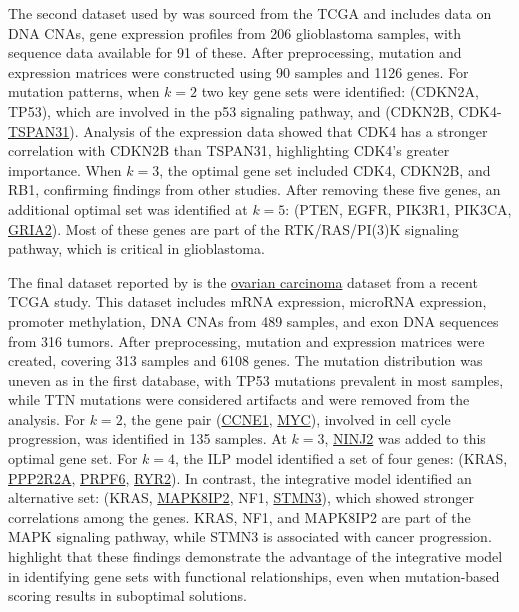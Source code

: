 The second dataset used by \textcite{mdpfinder} was sourced from the TCGA \cite{tcga} and includes data on DNA CNAs, gene expression profiles from 206 glioblastoma samples, with sequence data available for 91 of these. After preprocessing, mutation and expression matrices were constructed using 90 samples and 1126 genes. For mutation patterns, when $k = 2$ two key gene sets were identified: (CDKN2A, TP53), which are involved in the p53 signaling pathway, and (CDKN2B, CDK4-\href{https://www.ncbi.nlm.nih.gov/gene/6302}{TSPAN31}). Analysis of the expression data showed that CDK4 has a stronger correlation with CDKN2B than TSPAN31, highlighting CDK4’s greater importance. When $k = 3$, the optimal gene set included CDK4, CDKN2B, and RB1, confirming findings from other studies. After removing these five genes, an additional optimal set was identified at $k = 5$: (PTEN, EGFR, PIK3R1, PIK3CA, \href{https://www.ncbi.nlm.nih.gov/gene/2891}{GRIA2}). Most of these genes are part of the RTK/RAS/PI(3)K signaling pathway, which is critical in glioblastoma.

The final dataset reported by \textcite{mdpfinder} is the \href{https://en.wikipedia.org/wiki/Ovarian_cancer}{ovarian carcinoma} dataset from a recent TCGA study. This dataset includes mRNA expression, microRNA expression, promoter methylation, DNA CNAs from 489 samples, and exon DNA sequences from 316 tumors. After preprocessing, mutation and expression matrices were created, covering 313 samples and 6108 genes. The mutation distribution was uneven as in the first database, with TP53 mutations prevalent in most samples, while TTN mutations were considered artifacts and were removed from the analysis. For $k=2$, the gene pair (\href{https://www.ncbi.nlm.nih.gov/gene/898}{CCNE1}, \href{https://www.ncbi.nlm.nih.gov/gene/4609}{MYC}), involved in cell cycle progression, was identified in 135 samples. At $k=3$, \href{https://www.ncbi.nlm.nih.gov/gene/4815}{NINJ2} was added to this optimal gene set. For $k=4$, the ILP model identified a set of four genes: (KRAS, \href{https://www.ncbi.nlm.nih.gov/gene/5520}{PPP2R2A}, \href{https://www.ncbi.nlm.nih.gov/gene/24148}{PRPF6}, \href{https://www.ncbi.nlm.nih.gov/gene/6262}{RYR2}). In contrast, the integrative model identified an alternative set: (KRAS, \href{https://www.ncbi.nlm.nih.gov/gene/23542}{MAPK8IP2}, NF1, \href{https://www.ncbi.nlm.nih.gov/gene/50861}{STMN3}), which showed stronger correlations among the genes. KRAS, NF1, and MAPK8IP2 are part of the MAPK signaling pathway, while STMN3 is associated with cancer progression. \textcite{mdpfinder} highlight that these findings demonstrate the advantage of the integrative model in identifying gene sets with functional relationships, even when mutation-based scoring results in suboptimal solutions.

